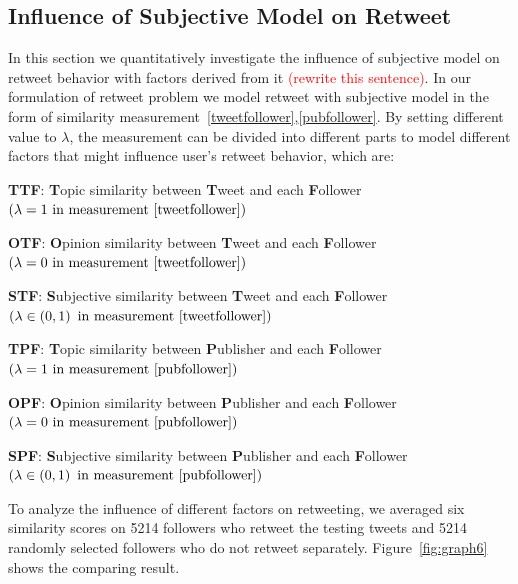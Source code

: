 \documentclass{acm_proc_article-sp}
\newcommand{\mo}[1]{\textcolor{red}{#1}}
\begin{document}
\subsection{Influence of Subjective  Model on Retweet}
\label{influence}
In this section we quantitatively investigate the influence of subjective model on retweet behavior with factors derived from it \mo{(rewrite this sentence)}. 
In our formulation of retweet problem we model retweet with subjective model in the form of similarity measurement~\ref{tweetfollower},\ref{pubfollower}.
By setting different value to $ \lambda $, the measurement can be divided into different parts to model different factors that might influence user's retweet behavior, which are:
\begin{itemize*}
\item \textbf{TTF}: \textbf{T}opic similarity between \textbf{T}weet and each \textbf{F}ollower $ \left( \lambda =1  \text{ in measurement~\ref{tweetfollower}} \right) $ 
\item \textbf{OTF}: \textbf{O}pinion similarity between \textbf{T}weet and each \textbf{F}ollower $ \left( \lambda =0 \text{ in measurement~\ref{tweetfollower}} \right) $
\item \textbf{STF}: \textbf{S}ubjective similarity between \textbf{T}weet and each \textbf{F}ollower $ \left( \lambda \in \left( 0,1 \right)   \text{ in measurement~\ref{tweetfollower}} \right) $ 
\item \textbf{TPF}: \textbf{T}opic similarity between \textbf{P}ublisher and each \textbf{F}ollower $ \left( \lambda =1  \text{ in measurement~\ref{pubfollower}}  \right) $ 
\item \textbf{OPF}: \textbf{O}pinion similarity between \textbf{P}ublisher and each \textbf{F}ollower $ \left( \lambda =0 \text{ in measurement~\ref{pubfollower}} \right) $
\item \textbf{SPF}: \textbf{S}ubjective similarity between \textbf{P}ublisher and each \textbf{F}ollower $ \left( \lambda \in \left( 0,1 \right)   \text{ in measurement~\ref{pubfollower}} \right) $
\end{itemize*}

To analyze the influence of different factors on retweeting, we averaged six similarity scores on 5214 followers who retweet the testing tweets and 5214 randomly selected followers who do not retweet separately.  Figure~\ref{fig:graph6} shows the comparing result.
\end{document}
